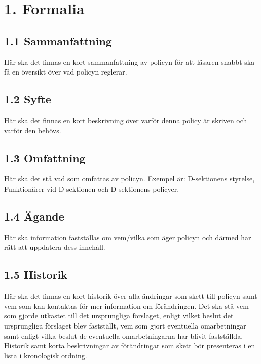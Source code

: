 \documentclass[]{dsekprotokoll}
\begin{document}
\hfill\begin{minipage}{\dimexpr\textwidth-3cm}
    \xdef\tpd{\the\prevdepth}
    \section*{1. Formalia}
    \subsection*{1.1 Sammanfattning}
    Här ska det finnas en kort sammanfattning av policyn för att läsaren snabbt ska få en översikt över vad policyn reglerar. \\

    \subsection*{1.2 Syfte}
    Här ska det finnas en kort beskrivning över varför denna policy är skriven och varför den behövs. \\

    \subsection*{1.3 Omfattning}
    Här ska det stå vad som omfattas av policyn. Exempel är: D-sektionens styrelse, Funktionärer vid D-sektionen och D-sektionens policyer.\\

    \subsection*{1.4 Ägande}
    Här ska information fastställas om vem/vilka som äger policyn och därmed har rätt att uppdatera dess innehåll. \\

    \subsection*{1.5 Historik}
    Här ska det finnas en kort historik över alla ändringar som skett till policyn samt vem som kan kontaktas för mer information om förändringen. Det ska stå vem som gjorde utkastet till det ursprungliga förslaget, enligt vilket beslut det ursprungliga förslaget blev fastställt, vem som gjort eventuella omarbetningar samt enligt vilka beslut de eventuella omarbetningarna har blivit fastställda.
    \\

    Historik samt korta beskrivningar av förändringar som skett bör presenteras i en lista i kronologisk ordning. \\
\end{minipage}
\end{document}
